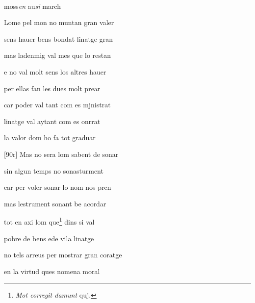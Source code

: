 \documentclass[12pt]{article}
\renewcommand{\espaiAbansEtiquetaPoema}{\vspace{0ex}}
\begin{document}
\begin{estrofa}

\espaiAbansEtiquetaPoema

\\

\begin{rubrica}

moss\textit{en} au\textit{si} march

\end{rubrica}

\end{estrofa}


\begin{estrofa}

 Lome pel mon no muntan gran valer

 sens hauer bens bondat linatge gran

 mas ladenmig val mes que lo restan

 e no val molt sens los altres hauer

 per ellas fan les dues molt prear

 car poder val tant com es mjnistrat

 linatge val aytant com es onrrat

 la valor dom ho fa tot graduar

\end{estrofa}



\begin{estrofa}

 [90r] Mas no sera lom sabent de sonar

 sin algun temps no sonasturment

 car per voler sonar lo nom nos pren

 mas lestrument sonant be acordar

 tot en axi  lom que\footnote{\textit{Mot corregit damunt} quj.} dins si
val

 pobre de bens ede vila linatge

 no tels arreus per mostrar gran coratge

 en la virtud ques nomena moral

\end{estrofa}
\end{document}
